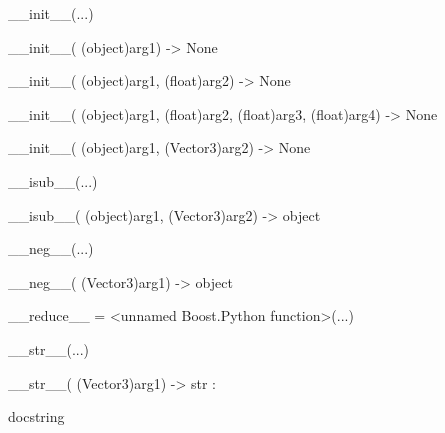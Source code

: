 \documentclass[letterpaper,10pt,english]{sphinxmanual}
\begin{document}
\begin{description}
\begin{description}
\begin{DUlineblock}{0em}
\begin{DUlineblock}{\DUlineblockindent}
\item[] 
\end{DUlineblock}
\item[] \_\_init\_\_(...)
\item[]
\begin{DUlineblock}{\DUlineblockindent}
\item[] \_\_init\_\_( (object)arg1) -\textgreater{} None
\item[] 
\item[] \_\_init\_\_( (object)arg1, (float)arg2) -\textgreater{} None
\item[] 
\item[] \_\_init\_\_( (object)arg1, (float)arg2, (float)arg3, (float)arg4) -\textgreater{} None
\item[] 
\item[] \_\_init\_\_( (object)arg1, (Vector3)arg2) -\textgreater{} None
\item[] 
\end{DUlineblock}
\item[] \_\_isub\_\_(...)
\item[]
\begin{DUlineblock}{\DUlineblockindent}
\item[] \_\_isub\_\_( (object)arg1, (Vector3)arg2) -\textgreater{} object
\item[] 
\end{DUlineblock}
\item[] \_\_neg\_\_(...)
\item[]
\begin{DUlineblock}{\DUlineblockindent}
\item[] \_\_neg\_\_( (Vector3)arg1) -\textgreater{} object
\item[] 
\end{DUlineblock}
\item[] \_\_reduce\_\_ = \textless{}unnamed Boost.Python function\textgreater{}(...)
\item[] 
\item[] \_\_str\_\_(...)
\item[]
\begin{DUlineblock}{\DUlineblockindent}
\item[] \_\_str\_\_( (Vector3)arg1) -\textgreater{} str :
\item[]
\begin{DUlineblock}{\DUlineblockindent}
\item[] docstring
\item[] 
\end{DUlineblock}
\end{DUlineblock}

\end{DUlineblock}
\end{description}
\end{description}
\end{document}
